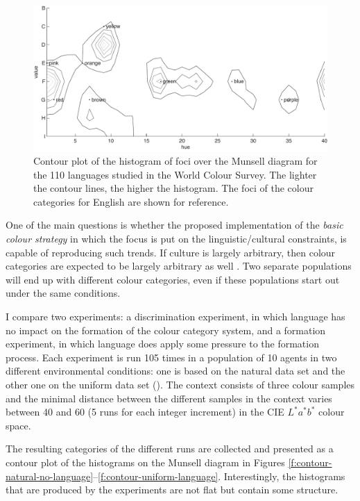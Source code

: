 \begin{figure}[htbp]
\centering
  \includegraphics[width=.85\textwidth]{./experiments/figures/contour-wcs}
  \caption[Contour plot of the World Color Survey]{Contour plot of
    the histogram of foci over the Munsell diagram for the 110
    languages studied in the World Colour Survey. The lighter the
    contour lines, the higher the histogram. The foci of the colour
    categories for English are shown for reference.}
\label{f:contour-wcs}
\end{figure}

One of the main questions is whether the proposed implementation of
the \emph{basic colour strategy} in which the focus is put on the
linguistic/cultural constraints, is capable of reproducing such
trends. If culture is largely arbitrary, then colour categories are
expected to be largely arbitrary as well \citep{roberson05color}. Two
separate populations will end up with different colour categories,
even if these populations start out under the same conditions.

I compare two experiments: a discrimination experiment, in which
language has no impact on the formation of the colour category system,
and a formation experiment, in which language does apply some pressure
to the formation process. Each experiment is run 105 times in a
population of 10 agents in two different environmental conditions: one
is based on the natural data set and the other one on the uniform data
set (). The context consists of
three colour samples and the minimal distance between the different
samples in the context varies between 40 and 60 (5 runs for each
integer increment) in the CIE $L^*a^*b^*$ colour space.

The resulting categories of the different runs are collected and
presented as a contour plot of the histograms on the Munsell diagram
in Figures
\ref{f:contour-natural-no-language}--\ref{f:contour-uniform-language}.
Interestingly, the histograms that are produced by the experiments are
not flat but contain some structure.

